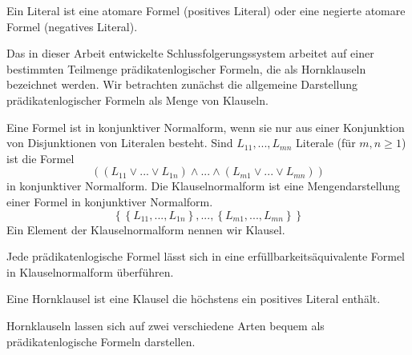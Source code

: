 \begin{leftbar}
  \begin{definition}[Literal]
    \newline
    Ein Literal ist eine atomare Formel (positives Literal) oder eine negierte atomare Formel (negatives Literal).
  \end{definition}
\end{leftbar}

Das in dieser Arbeit entwickelte Schlussfolgerungssystem arbeitet auf einer bestimmten Teilmenge prädikatenlogischer Formeln, die als Hornklauseln bezeichnet werden. Wir betrachten zunächst die allgemeine Darstellung prädikatenlogischer Formeln als Menge von Klauseln.

\begin{leftbar}
  \begin{definition}
    \newline
    Eine Formel ist in konjunktiver Normalform, wenn sie nur aus einer Konjunktion von Disjunktionen von Literalen besteht.
    \newline
    Sind $L_{11},...,L_{mn}$ Literale (für $m,n \geq 1$) ist die Formel
    \begin{equation}
      ((L_{11} \vee ... \vee L_{1n}) \wedge ... \wedge (L_{m1} \vee ... \vee L_{mn}))
    \end{equation}
    in konjunktiver Normalform.
    \newline
    Die Klauselnormalform ist eine Mengendarstellung einer Formel in konjunktiver Normalform.
    \begin{equation}
      \left \{ \left \{L_{11},...,L_{1n}\right \},...,\left \{ L_{m1},...,L_{mn}\right \} \right \}
    \end{equation}
    \newline
    Ein Element der Klauselnormalform nennen wir Klausel.
  \end{definition}
\end{leftbar}
\noindent
Jede prädikatenlogische Formel lässt sich in eine erfüllbarkeitsäquivalente Formel in Klauselnormalform überführen.

\begin{leftbar}
  \begin{definition}[Hornklausel]
    \newline
    Eine Hornklausel ist eine Klausel die höchstens ein positives Literal enthält.
  \end{definition}
\end{leftbar}
\noindent
Hornklauseln lassen sich auf zwei verschiedene Arten bequem als prädikatenlogische Formeln darstellen.

